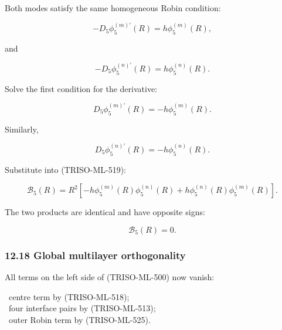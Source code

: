 \documentclass[11pt,a4paper]{article}
\begin{document}
Both modes satisfy the same homogeneous Robin condition:

\begin{equation}
-D_5\phi_5^{(m)\prime}(R)
=
h\phi_5^{(m)}(R),
\tag{TRISO-ML-520}
\label{eq:triso-ml-520}
\end{equation}

and

\begin{equation}
-D_5\phi_5^{(n)\prime}(R)
=
h\phi_5^{(n)}(R).
\tag{TRISO-ML-521}
\label{eq:triso-ml-521}
\end{equation}

Solve the first condition for the derivative:

\begin{equation}
D_5\phi_5^{(m)\prime}(R)
=
-h\phi_5^{(m)}(R).
\tag{TRISO-ML-522}
\label{eq:triso-ml-522}
\end{equation}

Similarly,

\begin{equation}
D_5\phi_5^{(n)\prime}(R)
=
-h\phi_5^{(n)}(R).
\tag{TRISO-ML-523}
\label{eq:triso-ml-523}
\end{equation}

Substitute into (TRISO-ML-519):

\begin{equation}
\mathcal B_5(R)
=
R^2
\left[
-h\phi_5^{(m)}(R)\phi_5^{(n)}(R)
+
h\phi_5^{(n)}(R)\phi_5^{(m)}(R)
\right].
\tag{TRISO-ML-524}
\label{eq:triso-ml-524}
\end{equation}

The two products are identical and have opposite signs:

\begin{equation}
\boxed{
\mathcal B_5(R)=0.
}
\tag{TRISO-ML-525}
\label{eq:triso-ml-525}
\end{equation}

\subsubsection*{12.18 Global multilayer orthogonality}

All terms on the left side of (TRISO-ML-500) now vanish:

\noindent\textbullet\ centre term by (TRISO-ML-518);\\
\noindent\textbullet\ four interface pairs by (TRISO-ML-513);\\
\noindent\textbullet\ outer Robin term by (TRISO-ML-525).\\
\end{document}
